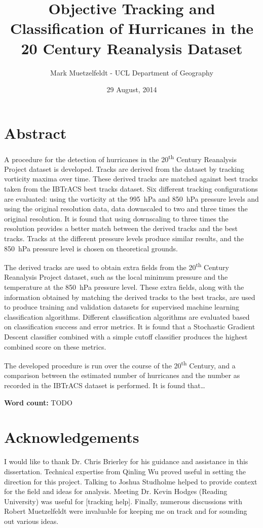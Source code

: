 \documentclass[pdftex,12pt,a4paper]{report}
\title{Objective Tracking and Classification of Hurricanes in the 20\ts{th} Century Reanalysis Dataset}
\author{Mark Muetzelfeldt - UCL Department of Geography}
\date{29 August, 2014}
\newcommand{\ts}{\textsuperscript}
\begin{document}


\onehalfspacing
\section*{Abstract}

A procedure for the detection of hurricanes in the 20\ts{th} Century Reanalysis Project dataset is
developed. Tracks are derived from the dataset by tracking vorticity maxima over time. These
derived tracks are matched against best tracks taken from the IBTrACS best tracks dataset. Six
different tracking configurations are evaluated: using the vorticity at the \SI{995}{hPa} and
\SI{850}{hPa} pressure levels and using the original resolution data, data downscaled to two and
three times the original resolution. It is found that using downscaling to three times the
resolution provides a better match between the derived tracks and the best tracks. Tracks
at the different pressure levels produce similar results, and the \SI{850}{hPa} pressure level is
chosen on theoretical grounds.

The derived tracks are used to obtain extra fields from the 20\ts{th} Century Reanalysis
Project dataset, such as the local minimum pressure and the temperature at the \SI{850}{hPa}
pressure level. These extra fields, along with the information obtained by matching the derived
tracks to the best tracks, are used to produce training and validation datasets for supervised
machine learning classification algorithms. Different classification algorithms are evaluated based
on classification success and error metrics. It is found that a Stochastic Gradient Descent
classifier combined with a simple cutoff classifier produces the highest combined score on these
metrics.

The developed procedure is run over the course of the 20\ts{th} Century, and a comparison between
the estimated number of hurricanes and the number as recorded in the IBTrACS dataset is performed.
It is found that\dots

\begin{center}
\textbf{Word count:} TODO
\end{center}

\section*{Acknowledgements}

I would like to thank Dr. Chris Brierley for his guidance and assistance in this dissertation.
Technical expertise from Qinling Wu proved useful in setting the direction for this project.
Talking to Joshua Studholme helped to provide context for the field and ideas for analysis. %
Meeting Dr. Kevin Hodges (Reading University) was useful for [tracking help].
Finally, numerous discussions with Robert Muetzelfeldt were invaluable for keeping me on track and
for sounding out various ideas.
\end{document}
